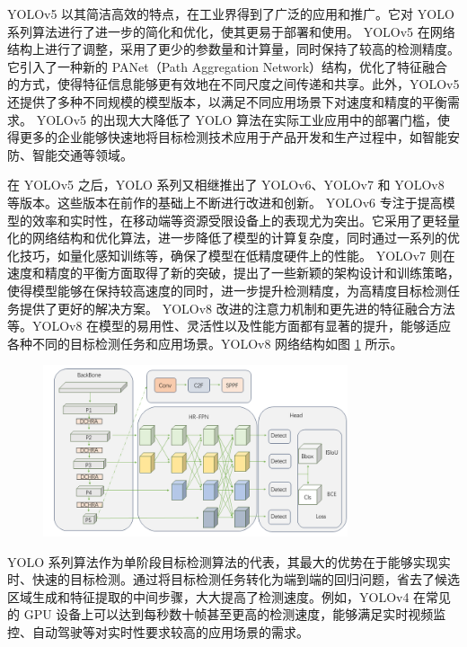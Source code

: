 YOLOv5 以其简洁高效的特点，在工业界得到了广泛的应用和推广。它对 YOLO 系列算法进行了进一步的简化和优化，使其更易于部署和使用。
YOLOv5 在网络结构上进行了调整，采用了更少的参数量和计算量，同时保持了较高的检测精度。它引入了一种新的 PANet（Path Aggregation Network）结构\cite{pan}，优化了特征融合的方式，使得特征信息能够更有效地在不同尺度之间传递和共享。此外，YOLOv5 还提供了多种不同规模的模型版本，以满足不同应用场景下对速度和精度的平衡需求。
YOLOv5 的出现大大降低了 YOLO 算法在实际工业应用中的部署门槛，使得更多的企业能够快速地将目标检测技术应用于产品开发和生产过程中，如智能安防、智能交通等领域。

在 YOLOv5 之后，YOLO 系列又相继推出了 YOLOv6、YOLOv7 和 YOLOv8 等版本。这些版本在前作的基础上不断进行改进和创新。
YOLOv6 专注于提高模型的效率和实时性，在移动端等资源受限设备上的表现尤为突出。它采用了更轻量化的网络结构和优化算法，进一步降低了模型的计算复杂度，同时通过一系列的优化技巧，如量化感知训练等，确保了模型在低精度硬件上的性能。
YOLOv7 则在速度和精度的平衡方面取得了新的突破，提出了一些新颖的架构设计和训练策略，使得模型能够在保持较高速度的同时，进一步提升检测精度，为高精度目标检测任务提供了更好的解决方案。
YOLOv8 改进的注意力机制和更先进的特征融合方法等。YOLOv8 在模型的易用性、灵活性以及性能方面都有显著的提升，能够适应各种不同的目标检测任务和应用场景。YOLOv8 网络结构如图 \ref{fig:yolov8} 所示。

\begin{figure}[htbp]
    \centering
    \includegraphics[width=0.8\textwidth]{../figure/yolov8.png}
    \captionsetup{font=footnotesize}
    \label{fig:yolov8}
\end{figure}

YOLO 系列算法作为单阶段目标检测算法的代表，其最大的优势在于能够实现实时、快速的目标检测。通过将目标检测任务转化为端到端的回归问题，省去了候选区域生成和特征提取的中间步骤，大大提高了检测速度。例如，YOLOv4 在常见的 GPU 设备上可以达到每秒数十帧甚至更高的检测速度，能够满足实时视频监控、自动驾驶等对实时性要求较高的应用场景的需求。

